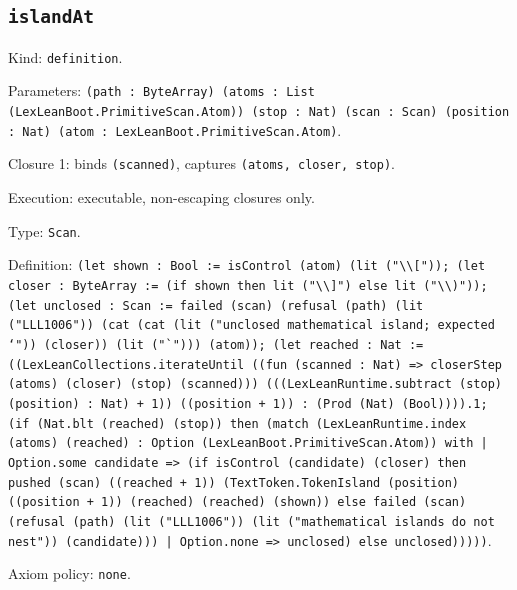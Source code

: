 \documentclass[11pt]{article}
\begin{document}
\subsection*{\texttt{islandAt}}
\noindent Kind: \texttt{definition}.\par
\noindent Parameters: \texttt{(path : ByteArray) (atoms : List (LexLeanBoot.PrimitiveScan.Atom)) (stop : Nat) (scan : Scan) (position : Nat) (atom : LexLeanBoot.PrimitiveScan.Atom)}.\par
\noindent Closure 1: binds \texttt{(scanned)}, captures \texttt{(atoms, closer, stop)}.\par
\noindent Execution: executable, non-escaping closures only.\par
\noindent Type: \texttt{Scan}.\par
\noindent Definition: \texttt{(let shown : Bool := isControl (atom) (lit ("\textbackslash{}\textbackslash{}[")); (let closer : ByteArray := (if shown then lit ("\textbackslash{}\textbackslash{}]") else lit ("\textbackslash{}\textbackslash{})")); (let unclosed : Scan := failed (scan) (refusal (path) (lit ("LLL1006")) (cat (cat (lit ("unclosed mathematical island; expected `")) (closer)) (lit ("`"))) (atom)); (let reached : Nat := ((LexLeanCollections.iterateUntil ((fun (scanned : Nat) => closerStep (atoms) (closer) (stop) (scanned))) (((LexLeanRuntime.subtract (stop) (position) : Nat) + 1)) ((position + 1)) : (Prod (Nat) (Bool)))).1; (if (Nat.blt (reached) (stop)) then (match (LexLeanRuntime.index (atoms) (reached) : Option (LexLeanBoot.PrimitiveScan.Atom)) with | Option.some candidate => (if isControl (candidate) (closer) then pushed (scan) ((reached + 1)) (TextToken.TokenIsland (position) ((position + 1)) (reached) (reached) (shown)) else failed (scan) (refusal (path) (lit ("LLL1006")) (lit ("mathematical islands do not nest")) (candidate))) | Option.none => unclosed) else unclosed)))))}.\par
\noindent Axiom policy: \texttt{none}.\par
\end{document}
